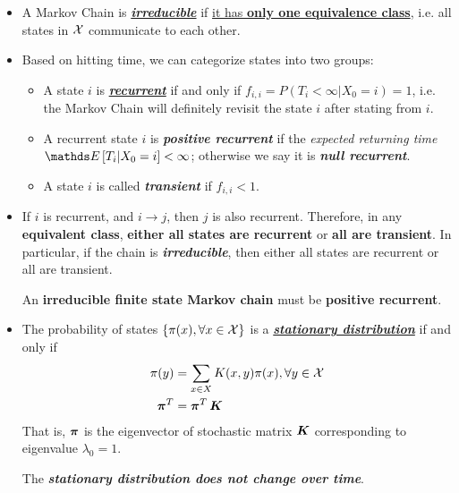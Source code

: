 \documentclass[11pt]{article}
\begin{document}
\begin{itemize}
\item A Markov Chain is \underline{\emph{\textbf{irreducible}}} if \underline{it has \textbf{only one equivalence class}}, i.e. all states in ${\mathcal X}$ communicate to each other.

\item Based on hitting time, we can categorize states into two groups:
\begin{itemize}
\item A state $i$ is \underline{\emph{\textbf{recurrent}}} if and only if \underline{$f_{i,i} =  P(T_{i} < \infty | X_{0} = i) = 1$}, i.e. the Markov Chain will definitely revisit the state $i$ after stating from $i$.

\item A recurrent state $i$ is \emph{\textbf{positive recurrent}} if the \emph{expected returning time} $\E{}{T_{i} | X_0 = i} < \infty$; otherwise we say it is \emph{\textbf{null recurrent}}.

\item A state $i$ is called \emph{\textbf{transient}} if $f_{i,i} < 1$.
\end{itemize}
\item
\begin{proposition}
If $i$ is recurrent, and $i \rightarrow j$, then $j$ is also recurrent. Therefore, in any \textbf{equivalent class}, \textbf{either all states are recurrent} or \textbf{all are transient}. In particular, if the chain is \emph{\textbf{irreducible}}, then either all states are recurrent or all are transient.
\end{proposition}

\begin{proposition}
An \textbf{irreducible finite state Markov chain} must be \textbf{positive recurrent}. 
\end{proposition}

\item \begin{definition}
The probability of states $\left\{\pi(x), \forall x\in {\mathcal X}\right\}$ is a \underline{\textbf{\emph{stationary distribution}}} if and only if 
\begin{align}
\pi(y) &= \sum_{x \in X}K(x, y)\pi(x), \forall y \in {\mathcal X} \label{eqn: mc_stationary}\\
\boldsymbol{\pi}^{T} &= \boldsymbol{\pi}^{T}\,\boldsymbol{K}  \label{eqn: mc_stationary_mat}
\end{align} That is, $\boldsymbol{\pi}$ is the eigenvector of stochastic matrix $\boldsymbol{K}$ corresponding to eigenvalue $\lambda_0 = 1$.
\end{definition} The \emph{\textbf{stationary distribution does not change over time}}.


\end{itemize}
\end{document}
